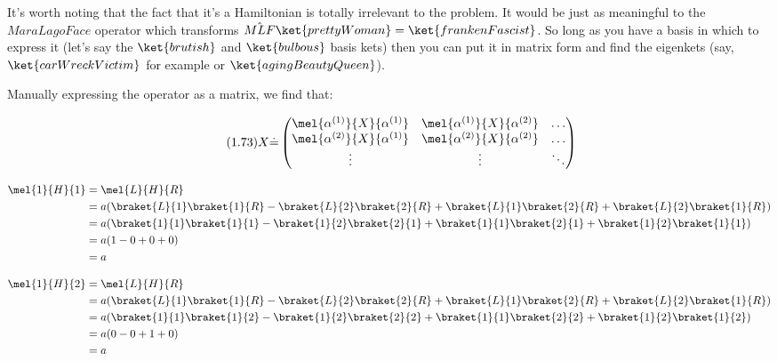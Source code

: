 \begin{answer}

  It's worth noting that the fact that it's a Hamiltonian is totally
  irrelevant to the problem.  It would be just as meaningful to the
  $MaraLagoFace$ operator which transforms $\hat{MLF}\ket{prettyWoman}
  = \ket{frankenFascist}$.  So long as you have a basis in which to
  express it (let's say the $\ket{brutish}$ and $\ket{bulbous}$ basis
  kets) then you can put it in matrix form and find the eigenkets
  (say, $\ket{carWreckVictim}$ for example or
  $\ket{agingBeautyQueen}$).
  
  Manually expressing the operator as a matrix, we find that:

  \begin{equation}
    \tag{1.73}
    X \dot{=}
    \begin{pmatrix}
      \mel{\alpha^{(1)}}{X}{\alpha^{(1)}} & \mel{\alpha^{(1)}}{X}{\alpha^{(2)}} & \ldots \\
      \mel{\alpha^{(2)}}{X}{\alpha^{(1)}} & \mel{\alpha^{(2)}}{X}{\alpha^{(2)}} & \ldots \\
      \vdots & \vdots & \ddots\\
    \end{pmatrix}
  \end{equation}

  \begin{equation}
    \begin{split}
      \mel{1}{H}{1}
      &= \mel{L}{H}{R}\\
      &=a(
      \braket{L}{1}\braket{1}{R}
      - \braket{L}{2}\braket{2}{R}
      + \braket{L}{1}\braket{2}{R}
      + \braket{L}{2}\braket{1}{R}
      )
      \\
      &=a(
      \braket{1}{1}\braket{1}{1}
      - \braket{1}{2}\braket{2}{1}
      + \braket{1}{1}\braket{2}{1}
      + \braket{1}{2}\braket{1}{1}
      )
      \\
      &=
      a(
      1
      - 0
      + 0
      + 0
      )
      \\
      &= a
    \end{split}
  \end{equation}

  \begin{equation}
    \begin{split}
      \mel{1}{H}{2}
      &= \mel{L}{H}{R}\\
      &=a(
      \braket{L}{1}\braket{1}{R}
      - \braket{L}{2}\braket{2}{R}
      + \braket{L}{1}\braket{2}{R}
      + \braket{L}{2}\braket{1}{R}
      )
      \\
      &=a(
      \braket{1}{1}\braket{1}{2}
      - \braket{1}{2}\braket{2}{2}
      + \braket{1}{1}\braket{2}{2}
      + \braket{1}{2}\braket{1}{2}
      )
      \\
      &=
      a(
      0
      - 0
      + 1
      + 0
      )
      \\
      &= a
    \end{split}
  \end{equation}


\end{answer}
